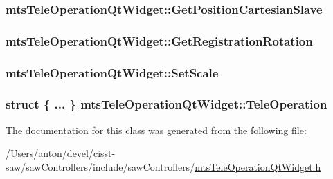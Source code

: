 \subsubsection[{Get\+Position\+Cartesian\+Slave}]{ mts\+Tele\+Operation\+Qt\+Widget\+::\+Get\+Position\+Cartesian\+Slave}\label{classmts_tele_operation_qt_widget_a79f316cb32e00b6562055802ebe7303c}
\hypertarget{classmts_tele_operation_qt_widget_a304765452ec072593f21b09016ef74d2}{}
\subsubsection[{Get\+Registration\+Rotation}]{ mts\+Tele\+Operation\+Qt\+Widget\+::\+Get\+Registration\+Rotation}\label{classmts_tele_operation_qt_widget_a304765452ec072593f21b09016ef74d2}
\hypertarget{classmts_tele_operation_qt_widget_ac2898212c3092185dd4a86dabfc8669e}{}
\subsubsection[{Set\+Scale}]{ mts\+Tele\+Operation\+Qt\+Widget\+::\+Set\+Scale}\label{classmts_tele_operation_qt_widget_ac2898212c3092185dd4a86dabfc8669e}
\hypertarget{classmts_tele_operation_qt_widget_a729484b5b1127662661f4a2f35fe5252}{}
\subsubsection[{Tele\+Operation}]{\setlength{\rightskip}{0pt plus 5cm}struct \{ ... \}   mts\+Tele\+Operation\+Qt\+Widget\+::\+Tele\+Operation\hspace{0.3cm}{\ttfamily [protected]}}\label{classmts_tele_operation_qt_widget_a729484b5b1127662661f4a2f35fe5252}


The documentation for this class was generated from the following file\+:\begin{DoxyCompactItemize}
\item 
/\+Users/anton/devel/cisst-\/saw/saw\+Controllers/include/saw\+Controllers/\hyperlink{mts_tele_operation_qt_widget_8h}{mts\+Tele\+Operation\+Qt\+Widget.\+h}\end{DoxyCompactItemize}
